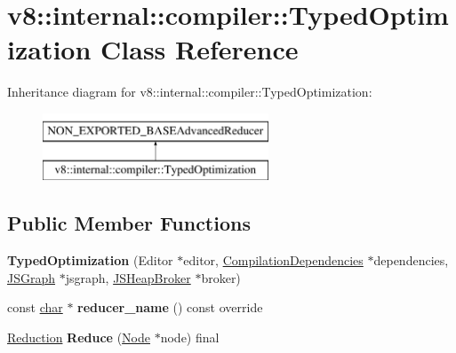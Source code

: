 \hypertarget{classv8_1_1internal_1_1compiler_1_1TypedOptimization}{}\section{v8\+:\+:internal\+:\+:compiler\+:\+:Typed\+Optimization Class Reference}
\label{classv8_1_1internal_1_1compiler_1_1TypedOptimization}
Inheritance diagram for v8\+:\+:internal\+:\+:compiler\+:\+:Typed\+Optimization\+:\begin{figure}[H]
\begin{center}
\leavevmode
\includegraphics[height=2.000000cm]{classv8_1_1internal_1_1compiler_1_1TypedOptimization}
\end{center}
\end{figure}
\subsection*{Public Member Functions}
\begin{DoxyCompactItemize}
\item 
\mbox{\label{classv8_1_1internal_1_1compiler_1_1TypedOptimization_a31ef4e1015687d06e18da7925dc21592}} 
{\bfseries Typed\+Optimization} (Editor $\ast$editor, \mbox{\hyperlink{classv8_1_1internal_1_1compiler_1_1CompilationDependencies}{Compilation\+Dependencies}} $\ast$dependencies, \mbox{\hyperlink{classv8_1_1internal_1_1compiler_1_1JSGraph}{J\+S\+Graph}} $\ast$jsgraph, \mbox{\hyperlink{classv8_1_1internal_1_1compiler_1_1JSHeapBroker}{J\+S\+Heap\+Broker}} $\ast$broker)
\item 
\mbox{\label{classv8_1_1internal_1_1compiler_1_1TypedOptimization_adc5566ef0a13b0a9a02e6b3e44ec8ec5}} 
const \mbox{\hyperlink{classchar}{char}} $\ast$ {\bfseries reducer\+\_\+name} () const override
\item 
\mbox{\label{classv8_1_1internal_1_1compiler_1_1TypedOptimization_accda01f62777d3521ef10ebb4effd423}} 
\mbox{\hyperlink{classv8_1_1internal_1_1compiler_1_1Reduction}{Reduction}} {\bfseries Reduce} (\mbox{\hyperlink{classv8_1_1internal_1_1compiler_1_1Node}{Node}} $\ast$node) final
\end{DoxyCompactItemize}


